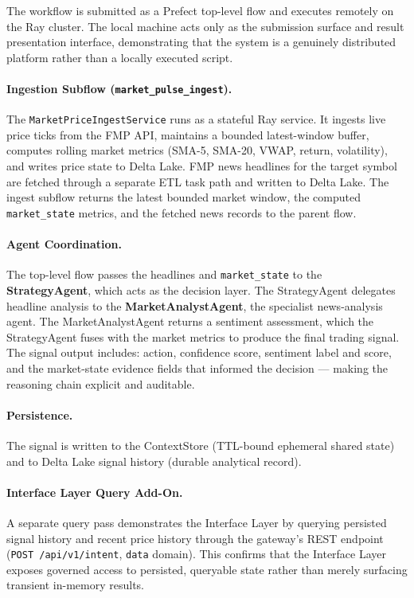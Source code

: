 \documentclass[12pt, a4paper]{report}
\begin{document}
The workflow is submitted as a Prefect top-level flow and executes remotely on the
Ray cluster. The local machine acts only as the submission surface and result
presentation interface, demonstrating that the system is a genuinely distributed
platform rather than a locally executed script.

\paragraph{Ingestion Subflow (\texttt{market\_pulse\_ingest}).}
The \texttt{MarketPriceIngestService} runs as a stateful Ray service.
It ingests live price ticks from the FMP API, maintains a bounded latest-window buffer,
computes rolling market metrics (SMA-5, SMA-20, VWAP, return, volatility), and writes
price state to Delta Lake.
FMP news headlines for the target symbol are fetched through a separate ETL task path
and written to Delta Lake.
The ingest subflow returns the latest bounded market window, the computed
\texttt{market\_state} metrics, and the fetched news records to the parent flow.

\paragraph{Agent Coordination.}
The top-level flow passes the headlines and \texttt{market\_state} to the
\textbf{StrategyAgent}, which acts as the decision layer.
The StrategyAgent delegates headline analysis to the \textbf{MarketAnalystAgent},
the specialist news-analysis agent.
The MarketAnalystAgent returns a sentiment assessment, which the StrategyAgent fuses
with the market metrics to produce the final trading signal.
The signal output includes: action, confidence score, sentiment label and score, and
the market-state evidence fields that informed the decision — making the reasoning
chain explicit and auditable.

\paragraph{Persistence.}
The signal is written to the ContextStore (TTL-bound ephemeral shared state) and to
Delta Lake signal history (durable analytical record).

\paragraph{Interface Layer Query Add-On.}
A separate query pass demonstrates the Interface Layer by querying persisted signal
history and recent price history through the gateway's REST endpoint
(\texttt{POST /api/v1/intent}, \texttt{data} domain).
This confirms that the Interface Layer exposes governed access to persisted, queryable
state rather than merely surfacing transient in-memory results.
\end{document}
